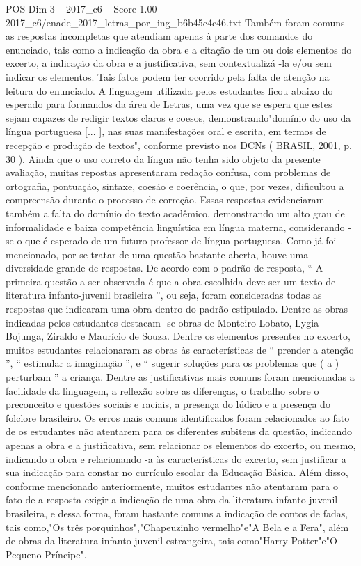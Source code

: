 \begin{textsample}{POS Dim 3 – 2017\_c6 – Score 1.00 – 2017\_c6/enade\_2017\_letras\_por\_ing\_b6b45c4c46.txt}
Também foram comuns as respostas incompletas que atendiam apenas à parte dos comandos do enunciado, tais como a indicação da obra e a citação de um ou dois elementos do excerto, a indicação da obra e a justificativa, sem contextualizá -la e/ou sem indicar os elementos.
Tais fatos podem ter ocorrido pela falta de atenção na leitura do enunciado.
A linguagem utilizada pelos estudantes ficou abaixo do esperado para formandos da área de Letras, uma vez que se espera que estes sejam capazes de redigir textos claros e coesos, demonstrando"domínio do uso da língua portuguesa [... ], nas suas manifestações oral e escrita, em termos de recepção e produção de textos", conforme previsto nos DCNs ( BRASIL, 2001, p. 30 ).
Ainda que o uso correto da língua não tenha sido objeto da presente avaliação, muitas repostas apresentaram redação confusa, com problemas de ortografia, pontuação, sintaxe, coesão e coerência, o que, por vezes, dificultou a compreensão durante o processo de correção.
Essas respostas evidenciaram também a falta do domínio do texto acadêmico, demonstrando um alto grau de informalidade e baixa competência linguística em língua materna, considerando -se o que é esperado de um futuro professor de língua portuguesa.
Como já foi mencionado, por se tratar de uma questão bastante aberta, houve uma diversidade grande de respostas.
De acordo com o padrão de resposta, “ A primeira questão a ser observada é que a obra escolhida deve ser um texto de literatura infanto-juvenil brasileira ”, ou seja, foram consideradas todas as respostas que indicaram uma obra dentro do padrão estipulado.
Dentre as obras indicadas pelos estudantes destacam -se obras de Monteiro Lobato, Lygia Bojunga, Ziraldo e Maurício de Souza.
Dentre os elementos presentes no excerto, muitos estudantes relacionaram as obras às características de “ prender a atenção ”, “ estimular a imaginação ”, e “ sugerir soluções para os problemas que ( a ) perturbam ” a criança.
Dentre as justificativas mais comuns foram mencionadas a facilidade da linguagem, a reflexão sobre as diferenças, o trabalho sobre o preconceito e questões sociais e raciais, a presença do lúdico e a presença do folclore brasileiro.
Os erros mais comuns identificados foram relacionados ao fato de os estudantes não atentarem para os diferentes subitens da questão, indicando apenas a obra e a justificativa, sem relacionar os elementos do excerto, ou mesmo, indicando a obra e relacionando -a às características do excerto, sem justificar a sua indicação para constar no currículo escolar da Educação Básica.
Além disso, conforme mencionado anteriormente, muitos estudantes não atentaram para o fato de a resposta exigir a indicação de uma obra da literatura infanto-juvenil brasileira, e dessa forma, foram bastante comuns a indicação de contos de fadas, tais como,"Os três porquinhos","Chapeuzinho vermelho"e"A Bela e a Fera", além de obras da literatura infanto-juvenil estrangeira, tais como"Harry Potter"e"O Pequeno Príncipe".

\end{textsample}
